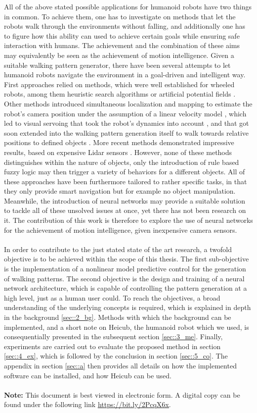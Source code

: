 All of the above stated possible applications for humanoid robots have two things in common. To achieve them, one has to investigate on methods that let the robots walk through the environments without falling, and additionally one has to figure how this ability can used to achieve certain goals while ensuring safe interaction with humans. The achievement and the combination of these aims may equivalently be seen as the achievement of motion intelligence. Given a suitable walking pattern generator, there have been several attempts to let humanoid robots navigate the environment in a goal-driven and intelligent way. First approaches relied on methods, which were well established for wheeled robots, among them heuristic search algorithms or artificial potential fields \cite{kuffner2005motion}. Other methods introduced simultaneous localization and mapping to estimate the robot's camera position under the assumption of a linear velocity model \cite{stasse2008integrating}, which led to visual servoing that took the robot's dynamics into account \cite{dune2010cancelling}, and that got soon extended into the walking pattern generation itself to walk towards relative positions to defined objects \cite{dune2011vision}. More recent methods demonstrated impressive results, based on expensive Lidar sensors \cite{griffin2019footstep}. However, none of these methods distinguishes within the nature of objects, only the introduction of rule based fuzzy logic \cite{dadios2012humanoid} may then trigger a variety of behaviors for a different objects. All of these approaches have been furthermore tailored to rather specific tasks, in that they only provide smart navigation but for example no object manipulation. Meanwhile, the introduction of neural networks may provide a suitable solution to tackle all of these unsolved issues at once, yet there has not been research on it. The contribution of this work is therefore to explore the use of neural networks for the achievement of motion intelligence, given inexpensive camera sensors.
\\\\
In order to contribute to the just stated state of the art research, a twofold objective is to be achieved within the scope of this thesis. The first sub-objective is the implementation of a nonlinear model predictive control for the generation of walking patterns. The second objective is the design and training of a neural network architecture, which is capable of controlling the pattern generation at a high level, just as a human user could. To reach the objectives, a broad understanding of the underlying concepts is required, which is explained in depth in the background \ref{sec::2_bg}. Methods with which the background can be implemented, and a short note on Heicub, the humanoid robot which we used, is consequentially presented in the subsequent section \ref{sec::3_me}. Finally, experiments are carried out to evaluate the proposed method in section \ref{sec::4_ex}, which is followed by the conclusion in section \ref{sec::5_co}. The appendix in section \ref{sec::a} then provides all details on how the implemented software can be installed, and how Heicub can be used.
\\\\
\textbf{Note:} This document is best viewed in electronic form. A digital copy can be found under the following link \href{https://bit.ly/2PcqX6x}{\underline{https://bit.ly/2PcqX6x}}.
